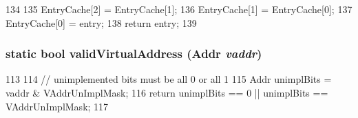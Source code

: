 \begin{DoxyCode}
134                                  {
135         EntryCache[2] = EntryCache[1];
136         EntryCache[1] = EntryCache[0];
137         EntryCache[0] = entry;
138         return entry;
139     }
\end{DoxyCode}
\hypertarget{classAlphaISA_1_1TLB_a3e576c3e0d39dfca708baea44ebf0617}{
\subsubsection[{validVirtualAddress}]{\setlength{\rightskip}{0pt plus 5cm}static bool validVirtualAddress ({\bf Addr} {\em vaddr})}}
\label{classAlphaISA_1_1TLB_a3e576c3e0d39dfca708baea44ebf0617}



\begin{DoxyCode}
113     {
114         // unimplemented bits must be all 0 or all 1
115         Addr unimplBits = vaddr & VAddrUnImplMask;
116         return unimplBits == 0 || unimplBits == VAddrUnImplMask;
117     }
\end{DoxyCode}


